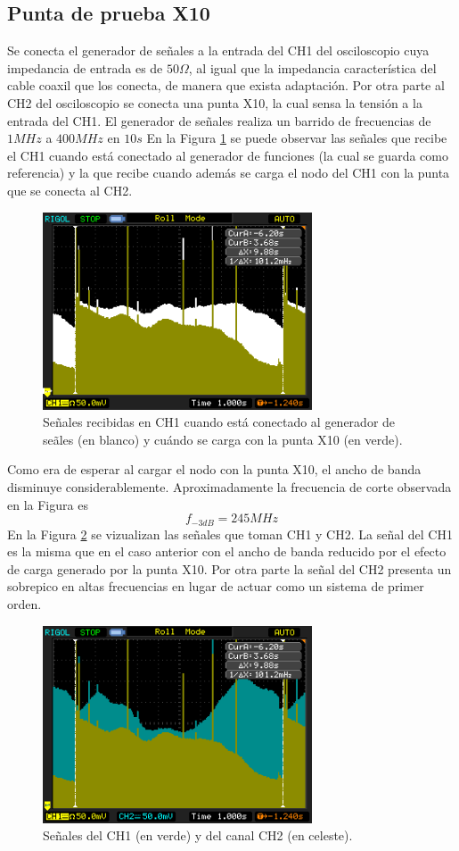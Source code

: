 \documentclass[a4paper,10pt]{article}
\begin{document}
		\subsection{Punta de prueba X10}
		Se conecta el generador de se\~nales a la entrada del CH1 del osciloscopio cuya impedancia de entrada es de $50 \Omega$, al igual que la impedancia caracter\'istica del cable coaxil que los conecta, de manera que exista adaptaci\'on. Por otra parte al CH2 del osciloscopio se conecta una punta X10, la cual sensa la tensi\'on a la entrada del CH1.
		El generador de se\~nales realiza un barrido de frecuencias de $1MHz$ a $400MHz$ en $10s$
		En la Figura \ref{img001} se puede observar las se\~nales que recibe el CH1 cuando est\'a conectado al generador de funciones (la cual se guarda como referencia) y la que recibe cuando adem\'as se carga el nodo del CH1 con la punta que se conecta al CH2.
		\begin{figure}[!htb]
			\centering
			\includegraphics[width=8cm]{Imagenes/Mediciones instrumentos/NewFile1.png}
			\caption{Se\~nales recibidas en CH1 cuando est\'a conectado al generador de se\~ales (en blanco) y cu\'ando se carga con la punta X10 (en verde).} \label{img001}
		\end{figure}
			
		Como era de esperar al cargar el nodo con la punta X10, el ancho de banda disminuye considerablemente. Aproximadamente la frecuencia de corte observada en la Figura es $$f_{-3dB}=245MHz$$
		En la Figura \ref{img000} se vizualizan las se\~nales que toman CH1 y CH2. La se\~nal del CH1 es la misma que en el caso anterior con el ancho de banda reducido por el efecto de carga generado por la punta X10. Por otra parte la se\~nal del CH2 presenta un sobrepico en altas frecuencias en lugar de actuar como un sistema de primer orden.
		\begin{figure}[!htb]
			\centering
			\includegraphics[width=8cm]{Imagenes/Mediciones instrumentos/NewFile0.png}
			\caption{Se\~nales del CH1 (en verde) y del canal CH2 (en celeste).} \label{img000}
		\end{figure}
									
\end{document}
